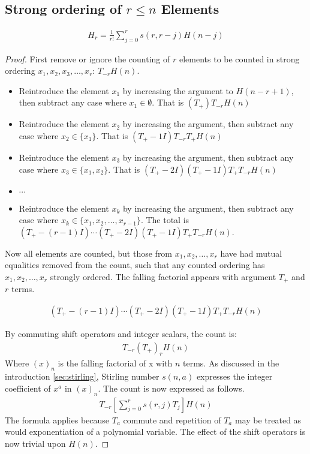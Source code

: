 \documentclass[12pt,reqno]{article}
\begin{document}
\subsection{Strong ordering of $r \leq n$ Elements}
\begin{theorem}\label{thm:2}

\begin{align}
	H_{r} = \frac{1}{r!} \sum_{j=0}^{r} s(r,r-j) H(n - j) 
\end{align}


\begin{proof}
First remove or ignore the counting of $r$ elements to be counted in strong ordering $x_{1}, x_{2}, x_{3}, \ldots, x_{r}$: $T_{- r}H(n)$.

\begin{itemize}
	\item{Reintroduce the element $x_{1}$ by increasing the argument to $H(n - r + 1)$, then subtract any case where $x_{1} \in \emptyset$. That is $(T_{+})T_{-r}H(n)$ }
	\item{Reintroduce the element $x_{2}$ by increasing the argument, then subtract any case where $x_{2} \in\{x_{1}\}$. That is $(T_{+} - 1I)T_{- r}T_{+}H(n)$ }
	\item{Reintroduce the element $x_{3}$ by increasing the argument, then subtract any case where $x_{3} \in \{x_{1}, x_{2}\}$. That is $(T_{+} - 2I)(T_{+} - 1I)T_{+}T_{-r}H(n)$ }
	\item{$\cdots$}
	\item{Reintroduce the element $x_{k}$ by increasing the argument, then subtract any case where $x_{k} \in \{x_{1}, x_{2}, \ldots ,x_{r - 1}\}$. The total is $(T_{+} - (r - 1)I)\cdots(T_{+} - 2I)(T_{+} - 1I)T_{+}T_{-r}H(n)$.}
\end{itemize}
Now all elements are counted, but those from $x_{1}, x_{2}, \ldots, x_{r}$ have had mutual equalities removed from the count, such that any counted ordering has $x_{1}, x_{2}, \ldots, x_{r}$ strongly ordered. The falling factorial appears with argument $T_{+}$ and $r$ terms. 

\begin{align}
	(T_{+} - (r - 1)I)\cdots(T_{+} - 2I)(T_{+} - 1I)T_{+} T_{-r}H(n)
\end{align}


By commuting shift operators and integer scalars, the count is:
\begin{align}
	T_{-r}(T_{+})_{r} H(n)\label{eqn:fall}
\end{align}
Where $(x)_{n}$ is the falling factorial of x with $n$ terms. As discussed in the introduction \ref{sec:stirling}, Stirling number $s(n,a)$ expresses the integer coefficient of $x^{a}$ in $(x)_{n}$. The count is now expressed as follows.
\begin{align}
	T_{-r} [\sum_{j = 0}^{r} s(r,j)T_{j}] H(n)
\end{align}
The formula applies because $T_{a}$ commute and repetition of $T_{a}$ may be treated as would exponentiation of a polynomial variable. The effect of the shift operators is now trivial upon $H(n)$.


\end{proof}
\end{theorem}
\end{document}
